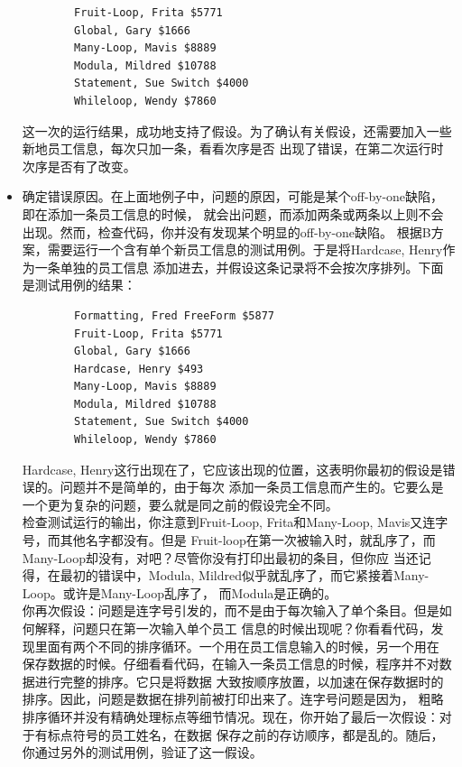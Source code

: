 \documentclass{article}
\begin{document}
\begin{itemize}
\begin{lstlisting}
        Fruit-Loop, Frita $5771
        Global, Gary $1666
        Many-Loop, Mavis $8889
        Modula, Mildred $10788
        Statement, Sue Switch $4000
        Whileloop, Wendy $7860
    \end{lstlisting}
    这一次的运行结果，成功地支持了假设。为了确认有关假设，还需要加入一些新地员工信息，每次只加一条，看看次序是否
    出现了错误，在第二次运行时次序是否有了改变。
    \item 确定错误原因。在上面地例子中，问题的原因，可能是某个off-by-one缺陷，即在添加一条员工信息的时候，
    就会出问题，而添加两条或两条以上则不会出现。然而，检查代码，你并没有发现某个明显的off-by-one缺陷。
    根据B方案，需要运行一个含有单个新员工信息的测试用例。于是将Hardcase, Henry作为一条单独的员工信息
    添加进去，并假设这条记录将不会按次序排列。下面是测试用例的结果：
    \begin{lstlisting}
        Formatting, Fred FreeForm $5877
        Fruit-Loop, Frita $5771
        Global, Gary $1666
        Hardcase, Henry $493
        Many-Loop, Mavis $8889
        Modula, Mildred $10788
        Statement, Sue Switch $4000
        Whileloop, Wendy $7860
    \end{lstlisting}
    Hardcase, Henry这行出现在了，它应该出现的位置，这表明你最初的假设是错误的。问题并不是简单的，由于每次
    添加一条员工信息而产生的。它要么是一个更为复杂的问题，要么就是同之前的假设完全不同。\\
    检查测试运行的输出，你注意到Fruit-Loop, Frita和Many-Loop, Mavis又连字号，而其他名字都没有。但是
    Fruit-loop在第一次被输入时，就乱序了，而Many-Loop却没有，对吧？尽管你没有打印出最初的条目，但你应
    当还记得，在最初的错误中，Modula, Mildred似乎就乱序了，而它紧接着Many-Loop。或许是Many-Loop乱序了，
    而Modula是正确的。\\
    你再次假设：问题是连字号引发的，而不是由于每次输入了单个条目。但是如何解释，问题只在第一次输入单个员工
    信息的时候出现呢？你看看代码，发现里面有两个不同的排序循环。一个用在员工信息输入的时候，另一个用在
    保存数据的时候。仔细看看代码，在输入一条员工信息的时候，程序并不对数据进行完整的排序。它只是将数据
    大致按顺序放置，以加速在保存数据时的排序。因此，问题是数据在排列前被打印出来了。连字号问题是因为，
    粗略排序循环并没有精确处理标点等细节情况。现在，你开始了最后一次假设：对于有标点符号的员工姓名，在数据
    保存之前的存访顺序，都是乱的。随后，你通过另外的测试用例，验证了这一假设。
\end{itemize}
\end{document}

